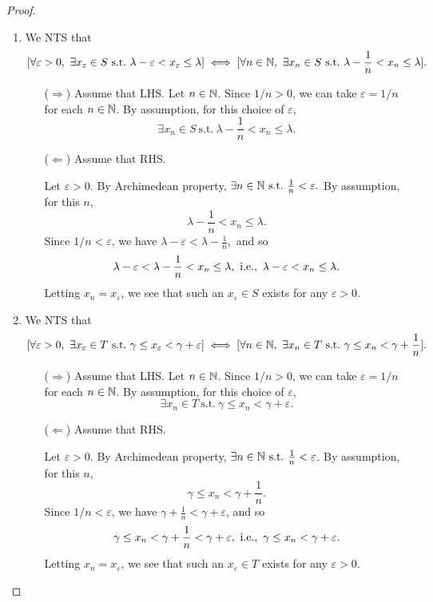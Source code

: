 \documentclass[11pt,openany]{article}
\begin{document}
\begin{proof}
\begin{enumerate}[(1)]
	\item We NTS that \[
	[\forall\varepsilon>0,\ \exists x_\varepsilon\in S\ \text{s.t.}\ \lambda-\varepsilon<x_\varepsilon\leq\lambda]
	\iff [\forall n\in\N,\ \exists x_n\in S\ \text{s.t.}\ \lambda-\frac{1}{n}<x_n\leq\lambda].
	\] \begin{itemize}
		\item[($\Rightarrow$)] Assume that LHS. Let $n\in\mathbb{N}$. Since $1/n>0$, we can take $\varepsilon=1/n$ for each $n\in\mathbb{N}$. By assumption, for this choice of $\varepsilon$, \[
		\exists x_n\in S\ \text{s.t.}\ \lambda-\frac{1}{n}< x_n\leq\lambda.
		\]
		\item[($\Leftarrow$)] Assume that RHS. 
		\begin{center}
		
		\end{center}
		Let $\varepsilon>0$. By Archimedean property, $\exists n\in\N\ \text{s.t.}\ \frac{1}{n}<\varepsilon.$ By assumption, for this $n$, \[
		\lambda-\frac{1}{n}< x_n\leq\lambda.
		\] Since $1/n<\varepsilon$, we have $\lambda-\varepsilon<\lambda-\frac{1}{n},$ and so \[
			\lambda-\varepsilon<\lambda-\frac{1}{n}<x_n\leq\lambda,\ \text{\ie},\ \lambda-\varepsilon< x_n\leq\lambda.
		\] Letting $x_n=x_\varepsilon$, we see that such an $x_\varepsilon\in S$ exists for any $\varepsilon>0$.
	\end{itemize}
	\item We NTS that \[
	[\forall\varepsilon>0,\ \exists x_\varepsilon\in T\ \text{s.t.}\ \gamma\leq x_\varepsilon<\gamma+\varepsilon]
	\iff[\forall n\in\mathbb{N},\ \exists x_n\in T\ \text{s.t.}\ \gamma\leq x_n<\gamma+\frac{1}{n}].
	\] \begin{itemize}
		\item[($\Rightarrow$)] Assume that LHS. Let $n\in\mathbb{N}$. Since $1/n>0$, we can take $\varepsilon=1/n$ for each $n\in\mathbb{N}$. By assumption, for this choice of $\varepsilon$, \[
		\exists x_n\in T\ \text{s.t.}\ \gamma\leq x_n< \gamma+\varepsilon.
		\]
		\item[($\Leftarrow$)] Assume that RHS. 
		\begin{center}
		
		\end{center}
		Let $\varepsilon>0$. By Archimedean property, $\exists n\in\N\ \text{s.t.}\ \frac{1}{n}<\varepsilon$. By assumption, for this $n$, \[
		\gamma\leq x_n<\gamma+\frac{1}{n}.
		\] Since $1/n<\varepsilon$, we have $\gamma+\frac{1}{n}<\gamma+\varepsilon$, and so \[
		\gamma\leq x_n<\gamma+\frac{1}{n}<\gamma+\varepsilon,\ \text{\ie},\ \gamma\leq x_n<\gamma+\varepsilon.
		\] Letting $x_n=x_\varepsilon$, we see that such an $x_\varepsilon\in T$ exists for any $\varepsilon>0$.
	\end{itemize}
\end{enumerate}
\end{proof}
\end{document}

